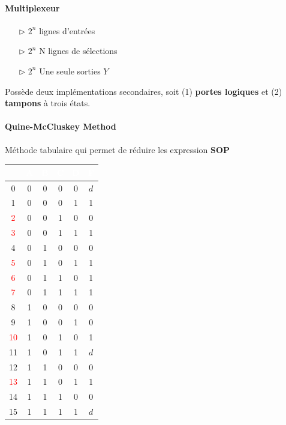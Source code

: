 \documentclass{report}
\begin{document}
\begin{multicols*}{3}
    \paragraph{Multiplexeur}
    \begin{itemize}
        \item[$\rhd$ ]  $2^n$ lignes d'entrées 
        \item[$\rhd$ ]  $2^n$ N lignes de sélections 
        \item[$\rhd$ ]  $2^n$ Une seule sorties $Y$  
    \end{itemize}
    Possède deux implémentations secondaires, soit (1) \textbf{portes logiques}
    et (2) \textbf{tampons} à trois états. 
    

    \paragraph{Quine-McCluskey Method} 
    Méthode tabulaire qui permet de réduire les expression \textbf{SOP}  


    \begin{center}
       \begin{tabular}{|c|c|c|c|c|c|}
      \hline
      \rowcolor{myg}
       &  \textcolor{white}{A} & \textcolor{white}{B} & \textcolor{white}{C} &
      \textcolor{white}{D} & \textcolor{white}{F}   \\
      \hline
      \textcolor{myb}{0} & 0 & 0 & 0 & 0 & \textcolor{myb}{$d$} \\
      \rowcolor{myg!40} 1 & 0 & 0 & 0 & 1 & 1 \\
      \textcolor{red}{2} & 0 & 0 & 1 & 0 & 0 \\
      \rowcolor{myg!40} \textcolor{red}{3} & 0 & 0 & 1 & 1 & 1 \\
      4 & 0 & 1 & 0 & 0 & 0 \\
      \rowcolor{myg!40} \textcolor{red}{5} & 0 & 1 & 0 & 1 & 1 \\
      \textcolor{red}{6} & 0 & 1 & 1 & 0 & 1 \\
      \rowcolor{myg!40} \textcolor{red}{7} & 0 & 1 & 1 & 1 & 1 \\
      8 & 1 & 0 & 0 & 0 & 0 \\
      \rowcolor{myg!40} 9 & 1 & 0 & 0 & 1 & 0 \\
      \textcolor{red}{10} & 1 & 0 & 1 & 0 & 1 \\
      \rowcolor{myg!40} \textcolor{myb}{11} & 1 & 0 & 1 & 1 & \textcolor{myb}{$d$} \\
      12 & 1 & 1 & 0 & 0 & 0 \\
      \rowcolor{myg!40} \textcolor{red}{13} & 1 & 1 & 0 & 1 & 1 \\
      14 & 1 & 1 & 1 & 0 & 0 \\
      \rowcolor{myg!40} \textcolor{myb}{15} & 1 & 1 & 1 & 1 & \textcolor{myb}{$d$} \\
      \hline 
      \end{tabular}  
    \end{center}


\end{multicols*}
\end{document}
